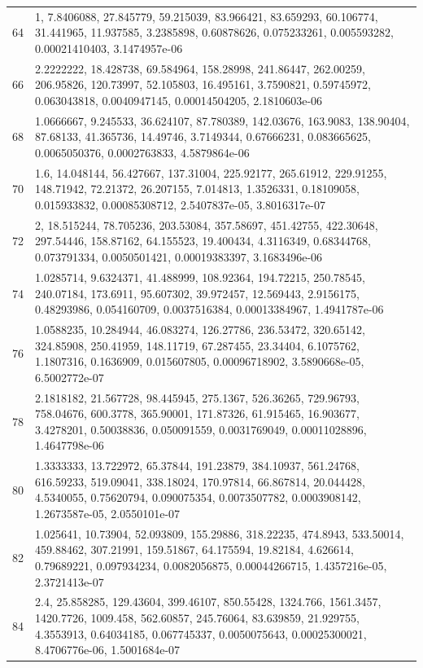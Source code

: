 \documentclass[11pt]{article}
\theoremstyle{definition}
\theoremstyle{remark}
\begin{document}
{\begin{longtable}{r p{}}
64 & 1, 7.8406088, 27.845779, 59.215039, 83.966421, 83.659293, 60.106774, 31.441965, 11.937585, 3.2385898, 0.60878626, 0.075233261, 0.005593282, 0.00021410403, 3.1474957e-06 \\
66 & 2.2222222, 18.428738, 69.584964, 158.28998, 241.86447, 262.00259, 206.95826, 120.73997, 52.105803, 16.495161, 3.7590821, 0.59745972, 0.063043818, 0.0040947145, 0.00014504205, 2.1810603e-06 \\
68 & 1.0666667, 9.245533, 36.624107, 87.780389, 142.03676, 163.9083, 138.90404, 87.68133, 41.365736, 14.49746, 3.7149344, 0.67666231, 0.083665625, 0.0065050376, 0.0002763833, 4.5879864e-06 \\
70 & 1.6, 14.048144, 56.427667, 137.31004, 225.92177, 265.61912, 229.91255, 148.71942, 72.21372, 26.207155, 7.014813, 1.3526331, 0.18109058, 0.015933832, 0.00085308712, 2.5407837e-05, 3.8016317e-07 \\
72 & 2, 18.515244, 78.705236, 203.53084, 357.58697, 451.42755, 422.30648, 297.54446, 158.87162, 64.155523, 19.400434, 4.3116349, 0.68344768, 0.073791334, 0.0050501421, 0.00019383397, 3.1683496e-06 \\
74 & 1.0285714, 9.6324371, 41.488999, 108.92364, 194.72215, 250.78545, 240.07184, 173.6911, 95.607302, 39.972457, 12.569443, 2.9156175, 0.48293986, 0.054160709, 0.0037516384, 0.00013384967, 1.4941787e-06 \\
76 & 1.0588235, 10.284944, 46.083274, 126.27786, 236.53472, 320.65142, 324.85908, 250.41959, 148.11719, 67.287455, 23.34404, 6.1075762, 1.1807316, 0.1636909, 0.015607805, 0.00096718902, 3.5890668e-05, 6.5002772e-07 \\
78 & 2.1818182, 21.567728, 98.445945, 275.1367, 526.36265, 729.96793, 758.04676, 600.3778, 365.90001, 171.87326, 61.915465, 16.903677, 3.4278201, 0.50038836, 0.050091559, 0.0031769049, 0.00011028896, 1.4647798e-06 \\
80 & 1.3333333, 13.722972, 65.37844, 191.23879, 384.10937, 561.24768, 616.59233, 519.09041, 338.18024, 170.97814, 66.867814, 20.044428, 4.5340055, 0.75620794, 0.090075354, 0.0073507782, 0.0003908142, 1.2673587e-05, 2.0550101e-07 \\
82 & 1.025641, 10.73904, 52.093809, 155.29886, 318.22235, 474.8943, 533.50014, 459.88462, 307.21991, 159.51867, 64.175594, 19.82184, 4.626614, 0.79689221, 0.097934234, 0.0082056875, 0.00044266715, 1.4357216e-05, 2.3721413e-07 \\
84 & 2.4, 25.858285, 129.43604, 399.46107, 850.55428, 1324.766, 1561.3457, 1420.7726, 1009.458, 562.60857, 245.76064, 83.639859, 21.929755, 4.3553913, 0.64034185, 0.067745337, 0.0050075643, 0.00025300021, 8.4706776e-06, 1.5001684e-07 \\

\end{longtable}}
\end{document}
